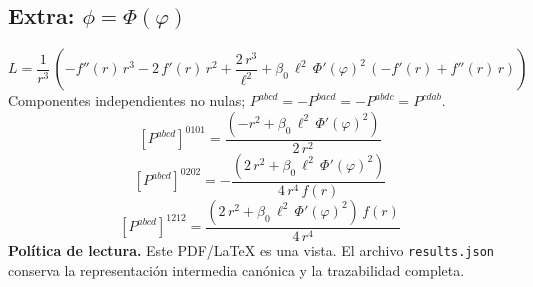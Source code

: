 \documentclass[11pt]{article}
\begin{document}
\subsection*{Extra: $\phi=\Phi\!\left(\varphi\right)$}
\begin{dmath*}[breakdepth={5}]
L=\frac{1}{{r}^{3}}\,\left(-f''\!\left(r\right)\,{r}^{3} - 2\,f'\!\left(r\right)\,{r}^{2} + \frac{2\,{r}^{3}}{{\ell}^{2}} + \beta_{0}\,{\ell}^{2}\,{\Phi'\!\left(\varphi\right)}^{2}\,\left(-f'\!\left(r\right) + f''\!\left(r\right)\,r\right)\right)
\end{dmath*}
Componentes independientes no nulas; $P^{abcd}=-P^{bacd}=-P^{abdc}=P^{cdab}$.
\begin{dmath*}[breakdepth={5}]
\left[P^{abcd}\right]^{0101}=\frac{\left(-{r}^{2} + \beta_{0}\,{\ell}^{2}\,{\Phi'\!\left(\varphi\right)}^{2}\right)}{2\,{r}^{2}}
\end{dmath*}
\begin{dmath*}[breakdepth={5}]
\left[P^{abcd}\right]^{0202}=-\frac{\left(2\,{r}^{2} + \beta_{0}\,{\ell}^{2}\,{\Phi'\!\left(\varphi\right)}^{2}\right)}{4\,{r}^{4}\,f\!\left(r\right)}
\end{dmath*}
\begin{dmath*}[breakdepth={5}]
\left[P^{abcd}\right]^{1212}=\frac{\left(2\,{r}^{2} + \beta_{0}\,{\ell}^{2}\,{\Phi'\!\left(\varphi\right)}^{2}\right)\,f\!\left(r\right)}{4\,{r}^{4}}
\end{dmath*}
\bigskip\noindent\textbf{Política de lectura.} Este PDF/LaTeX es una vista. El archivo \texttt{results.json} conserva la representación intermedia canónica y la trazabilidad completa.
\end{document}
